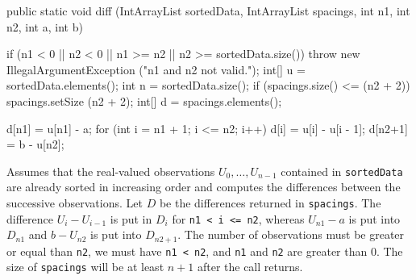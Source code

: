 \begin{htmlonly}
\end{htmlonly}
\begin{code}

   public static void diff (IntArrayList sortedData, IntArrayList spacings,
                            int n1, int n2, int a, int b)\begin{hide} {
      if (n1 < 0 || n2 < 0 || n1 >= n2 || n2 >= sortedData.size())
         throw new IllegalArgumentException ("n1 and n2 not valid.");
      int[] u = sortedData.elements();
      int n = sortedData.size();
      if (spacings.size() <= (n2 + 2))
         spacings.setSize (n2 + 2);
      int[] d = spacings.elements();

      d[n1] = u[n1] - a;
      for (int i = n1 + 1; i <= n2; i++)
         d[i] = u[i] - u[i - 1];
      d[n2+1] = b - u[n2];
   }\end{hide}
\end{code}
 \begin{tabb} Assumes that the real-valued observations $U_0,\dots,U_{n-1}$
  contained in \texttt{sortedData}
  are already sorted in increasing order and computes the differences
  between the successive observations. Let $D$ be the differences
  returned in \texttt{spacings}.
  The difference $U_i - U_{i-1}$ is put in $D_i$ for
  \texttt{n1 < i <= n2}, whereas $U_{n1} - a$ is put into $D_{n1}$
  and $b - U_{n2}$ is put into $D_{n2+1}$.
%
  The number of observations must be greater or equal than \texttt{n2}, we
  must have
  \texttt{n1 < n2}, and \texttt{n1} and \texttt{n2} are greater than 0.
  The size of \texttt{spacings} will be at least $n+1$ after
  the call returns.
 \end{tabb}
\begin{htmlonly}
\end{htmlonly}
